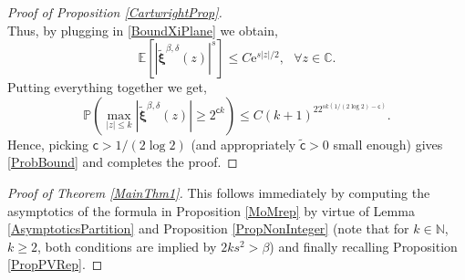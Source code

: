 \documentclass[]{article}
\begin{document}
\begin{proof}[Proof of Proposition \ref{CartwrightProp}]
\begin{equation*}
\end{equation*}
Thus, by plugging in \eqref{BoundXiPlane} we obtain, 
\begin{equation*}
\mathbb{E}\left[\left|\tilde{\boldsymbol{\xi}}^{\beta,\delta}(z)\right|^s\right] \le C\mathrm{e}^{s|z|/2}, \ \ \ \forall z \in \mathbb{C}.
\end{equation*}
Putting everything together we get, 
\begin{equation*}
\mathbb{P}\left(\max_{|z|\le k}\left|\tilde{\boldsymbol{\xi}}^{\beta,\delta}(z)\right|\ge 2^{\mathsf{c}k}\right)\le C(k+1)^22^{sk(1/(2\log 2)-\mathsf{{c}})}.
\end{equation*}
Hence, picking $\mathsf{c}>1/(2 \log 2)$ (and appropriately $\tilde{\mathsf{c}}>0$ small enough) gives \eqref{ProbBound} and completes the proof.

\end{proof}


\begin{proof} [Proof of Theorem \ref{MainThm1}]
This follows immediately by computing the asymptotics of the formula in Proposition \ref{MoMrep} by virtue of Lemma \ref{AsymptoticsPartition} and Proposition \ref{PropNonInteger} (note that for $k\in \mathbb{N}$, $k\ge 2$, both conditions are implied by $2ks^2>\beta$) and finally recalling Proposition \ref{PropPVRep}.
\end{proof}
\end{document}
